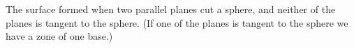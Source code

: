 The surface formed when two parallel planes cut a sphere, and neither of the
planes is tangent to the sphere. (If one of the planes is tangent to the sphere
we have a zone of one base.)
